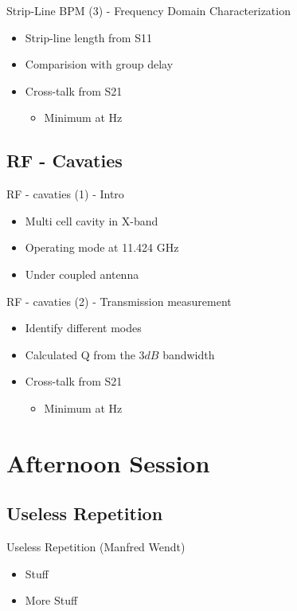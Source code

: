 \documentclass{beamer}
\begin{document}
\begin{frame}[t,fragile]{Strip-Line BPM (3) - Frequency Domain Characterization}
\begin{itemize}
\item Strip-line length from S11
\item Comparision with group delay
\item Cross-talk from S21
\begin{itemize}
\item Minimum at Hz
\end{itemize}
\end{itemize}
\end{frame}

\subsection{RF - Cavaties}
\begin{frame}[t,fragile]{RF - cavaties (1) - Intro}
\begin{itemize}
\item Multi cell cavity in X-band
\item Operating mode at 11.424 GHz
\item Under coupled antenna
\end{itemize}
\end{frame}

\begin{frame}[t,fragile]{RF - cavaties (2) - Transmission measurement}
\begin{itemize}
\item Identify different modes 
\item Calculated Q from the $3 dB$ bandwidth
\item Cross-talk from S21
\begin{itemize}
\item Minimum at Hz
\end{itemize}
\end{itemize}
\end{frame}

\section{Afternoon Session}
\subsection{Useless Repetition}
\begin{frame}[t,fragile]{Useless Repetition (Manfred Wendt)}
\begin{itemize}
\item Stuff
\item More Stuff
\end{itemize}
\begin{figure}
  \centering
  \quad
  \\
  \quad
\end{figure}
\end{frame}
\end{document}
